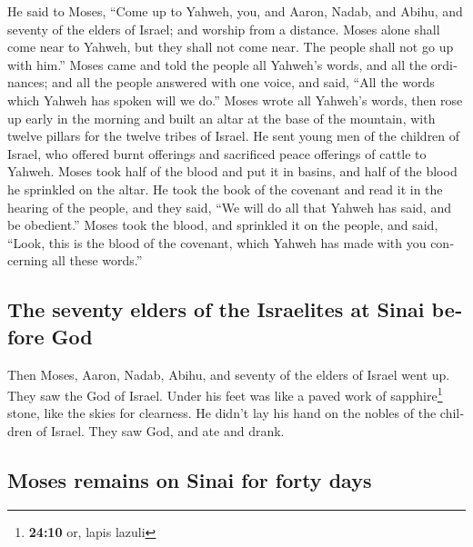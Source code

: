 \begin{paracol}{2}
\begin{otherlanguage}{english}
 He said to Moses, ``Come up to Yahweh, you, and Aaron,
Nadab, and Abihu, and seventy of the elders of Israel; and worship from
a distance.  Moses alone shall come near to Yahweh, but
they shall not come near. The people shall not go up with him.''
 Moses came and told the people all Yahweh's words, and
all the ordinances; and all the people answered with one voice, and
said, ``All the words which Yahweh has spoken will we do.''
 Moses wrote all Yahweh's words, then rose up early in the
morning and built an altar at the base of the mountain, with twelve
pillars for the twelve tribes of Israel.  He sent young
men of the children of Israel, who offered burnt offerings and
sacrificed peace offerings of cattle to Yahweh.  Moses
took half of the blood and put it in basins, and half of the blood he
sprinkled on the altar.  He took the book of the covenant
and read it in the hearing of the people, and they said, ``We will do
all that Yahweh has said, and be obedient.''  Moses took
the blood, and sprinkled it on the people, and said, ``Look, this is the
blood of the covenant, which Yahweh has made with you concerning all
these words.''

\hypertarget{the-seventy-elders-of-the-israelites-at-sinai-before-god}{%
\subsection{The seventy elders of the Israelites at Sinai before
God}\label{the-seventy-elders-of-the-israelites-at-sinai-before-god}}

 Then Moses, Aaron, Nadab, Abihu, and seventy of the
elders of Israel went up.  They saw the God of Israel.
Under his feet was like a paved work of sapphire\footnote{\textbf{24:10}
  or, lapis lazuli} stone, like the skies for clearness. 
He didn't lay his hand on the nobles of the children of Israel. They saw
God, and ate and drank.

\hypertarget{moses-remains-on-sinai-for-forty-days}{%
\subsection{Moses remains on Sinai for forty
days}\label{moses-remains-on-sinai-for-forty-days}}


\end{otherlanguage}
\end{paracol}
